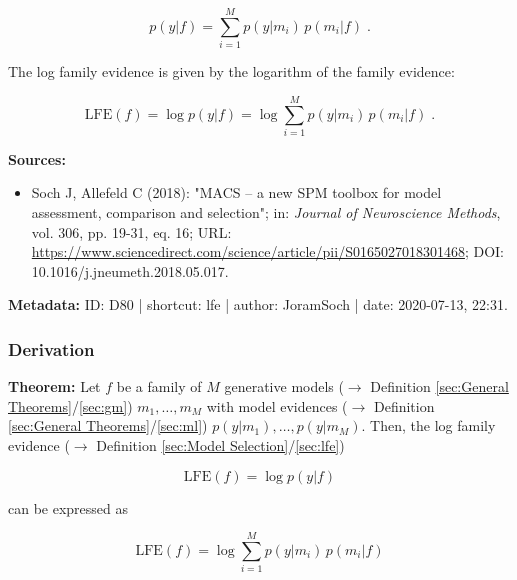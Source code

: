 \documentclass[a4paper,12pt,twoside]{book}
\begin{document}
\begin{equation} \label{eq:lfe-fe}
p(y|f) = \sum_{i=1}^M p(y|m_i) \, p(m_i|f) \; .
\end{equation}

The log family evidence is given by the logarithm of the family evidence:

\begin{equation} \label{eq:lfe-lfe}
\mathrm{LFE}(f) = \log p(y|f) = \log \sum_{i=1}^M p(y|m_i) \, p(m_i|f) \; .
\end{equation}


\vspace{1em}
\textbf{Sources:}
\begin{itemize}
\item Soch J, Allefeld C (2018): "MACS – a new SPM toolbox for model assessment, comparison and selection"; in: \textit{Journal of Neuroscience Methods}, vol. 306, pp. 19-31, eq. 16; URL: \url{https://www.sciencedirect.com/science/article/pii/S0165027018301468}; DOI: 10.1016/j.jneumeth.2018.05.017.
\end{itemize}


\vspace{1em}
\textbf{Metadata:} ID: D80 | shortcut: lfe | author: JoramSoch | date: 2020-07-13, 22:31.
\vspace{1em}



\subsubsection[\textbf{Derivation}]{Derivation} \label{sec:lfe-der}
\setcounter{equation}{0}

\textbf{Theorem:} Let $f$ be a family of $M$ generative models ($\rightarrow$ Definition \ref{sec:General Theorems}/\ref{sec:gm}) $m_1, \ldots, m_M$ with model evidences ($\rightarrow$ Definition \ref{sec:General Theorems}/\ref{sec:ml}) $p(y \vert m_1), \ldots, p(y \vert m_M)$. Then, the log family evidence ($\rightarrow$ Definition \ref{sec:Model Selection}/\ref{sec:lfe})

\begin{equation} \label{eq:lfe-der-LFE-term}
\mathrm{LFE}(f) = \log p(y|f)
\end{equation}

can be expressed as

\begin{equation} \label{eq:lfe-der-LFE-marg}
\mathrm{LFE}(f) = \log \sum_{i=1}^M p(y|m_i) \, p(m_i|f)
\end{equation}
\end{document}
